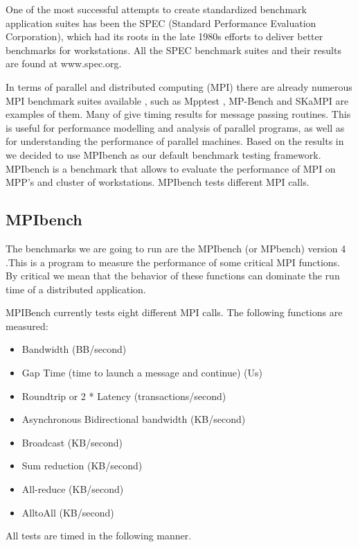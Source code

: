 One of the most successful attempts to create standardized benchmark
application suites has been the SPEC (Standard Performance Evaluation
Corporation), which had its roots in the late 1980s efforts to deliver better
benchmarks for workstations\cite{Hennessy}. All the SPEC benchmark suites and
their results are found at www.spec.org.

In terms of parallel and distributed computing (MPI) there are already numerous
MPI benchmark suites available , such as Mpptest \cite{Gropp}, MP-Bench
\cite{Calderon} and  SKaMPI \cite{Hoefler} are examples of them. Many of give
timing results for message passing routines. This is useful for performance
modelling and analysis of parallel programs, as well as for understanding the
performance of parallel machines. Based on the results in \cite{Grove} we
decided to use MPIbench as our default benchmark testing framework. MPIbench is
a benchmark that allows to evaluate the performance of MPI on MPP's and cluster
of workstations. MPIbench tests different MPI calls.

\subsection{MPIbench}
\noindent

The benchmarks we are going to run are the MPIbench (or MPbench) version 4
\cite{mpibench}.This is a program to measure the performance of some critical
MPI functions. By critical we mean that the behavior of these functions can
dominate the run time of a distributed application.

MPIBench currently tests eight different MPI calls. The following functions are
measured:

\begin{itemize}
    \item Bandwidth (BB/second)
    \item Gap Time (time to launch a message and continue) (Us)
    \item Roundtrip or 2 * Latency (transactions/second)
    \item Asynchronous Bidirectional bandwidth (KB/second)
    \item Broadcast (KB/second)
    \item Sum reduction (KB/second)
    \item All-reduce (KB/second)
    \item AlltoAll (KB/second)
\end{itemize}


All tests are timed in the following manner.

